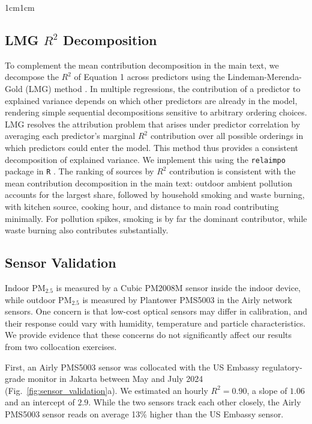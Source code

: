 \documentclass[9pt,twoside]{pnas-new}
\begin{document}
\begin{adjustwidth}{1cm}{1cm}
\newpage

\subsection*{LMG $R^2$ Decomposition} 
To complement the mean contribution decomposition in the main text, we decompose the $R^2$ of Equation 1 across predictors using the Lindeman-Merenda-Gold (LMG) method \citep{lindeman_introduction_1980}. 
In multiple regressions, the contribution of a predictor to explained variance depends on which other predictors are already in the model, rendering simple sequential decompositions sensitive to arbitrary ordering choices. LMG resolves the attribution problem that arises under predictor correlation by averaging each predictor's marginal $R^2$ contribution over all possible orderings in which predictors could enter the model. This method thus provides a consistent decomposition of explained variance. We implement this using the \texttt{relaimpo} package in \texttt{R} \citep{gromping_relative_2006}. 
The ranking of sources by $R^2$ contribution is consistent with the mean contribution decomposition in the main text: outdoor ambient pollution accounts for the largest share, followed by household smoking and waste burning, with kitchen source, cooking hour, and distance to main road contributing minimally. For pollution spikes, smoking is by far the dominant contributor, while waste burning also contributes substantially.



\newpage 

\subsection*{Sensor Validation}

Indoor PM$_{2.5}$ is measured by a Cubic PM2008M sensor inside the indoor device, while outdoor PM$_{2.5}$ is measured by Plantower PMS5003 in the Airly network sensors. One concern is that low-cost optical sensors may differ in calibration, and their response could vary with humidity, temperature and particle characteristics. We provide evidence that these concerns do not significantly affect our results from two collocation exercises.

First, an Airly PMS5003 sensor was collocated with the US Embassy regulatory-grade monitor in Jakarta between May and July 2024 (Fig.~\ref{fig:sensor_validation}a). We estimated an hourly $R^2 = 0.90$, a slope of $1.06$ and an intercept of $2.9$. While the two sensors track each other closely, the Airly PMS5003 sensor reads on average 13\% higher than the US Embassy sensor. 


\end{adjustwidth}
\end{document}
